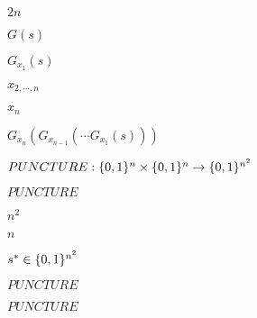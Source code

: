 \documentclass[10pt]{book}
\begin{document}
\begin{mdSnippets}
\begin{mdInlineSnippet}[21e2c0c0472b331622877accbe29b91b]%
$2n$\end{mdInlineSnippet}%
\begin{mdInlineSnippet}%
$G(s)$\end{mdInlineSnippet}%
\begin{mdInlineSnippet}[9a3ea7bb93bc3cb79a5f065ee632cb20]%
$G_{x_1}(s)$\end{mdInlineSnippet}%
\begin{mdInlineSnippet}[c62635cd13b95560236f2bc99a07f360]%
$x_{2,\cdots,n}$\end{mdInlineSnippet}%
\begin{mdInlineSnippet}%
$x_n$\end{mdInlineSnippet}%
\begin{mdInlineSnippet}[472574514da402ac6d5c80dcb22b2150]%
$G_{x_n}(G_{x_{n-1}}(\cdots G_{x_1}(s)))$\end{mdInlineSnippet}%
\begin{mdInlineSnippet}%
$PUNCTURE: \{0,1\}^n \times \{0,1\}^n \to \{0,1\}^{n^2}$\end{mdInlineSnippet}%
\begin{mdInlineSnippet}[0ae38247a0db2f3b37545a2237f9ddb7]%
$PUNCTURE$\end{mdInlineSnippet}%
\begin{mdInlineSnippet}[6595d679e306a127a3fe53268bcaddb2]%
$n^2$\end{mdInlineSnippet}%
\begin{mdInlineSnippet}[7b8b965ad4bca0e41ab51de7b31363a1]%
$n$\end{mdInlineSnippet}%
\begin{mdInlineSnippet}[9613a7bcb1a19d59b35050db2e7f54c2]%
$s^* \in \{0,1\}^{n^2}$\end{mdInlineSnippet}%
\begin{mdInlineSnippet}[0ae38247a0db2f3b37545a2237f9ddb7]%
$PUNCTURE$\end{mdInlineSnippet}%
\begin{mdInlineSnippet}[0ae38247a0db2f3b37545a2237f9ddb7]%
$PUNCTURE$\end{mdInlineSnippet}%

\end{mdSnippets}
\end{document}
